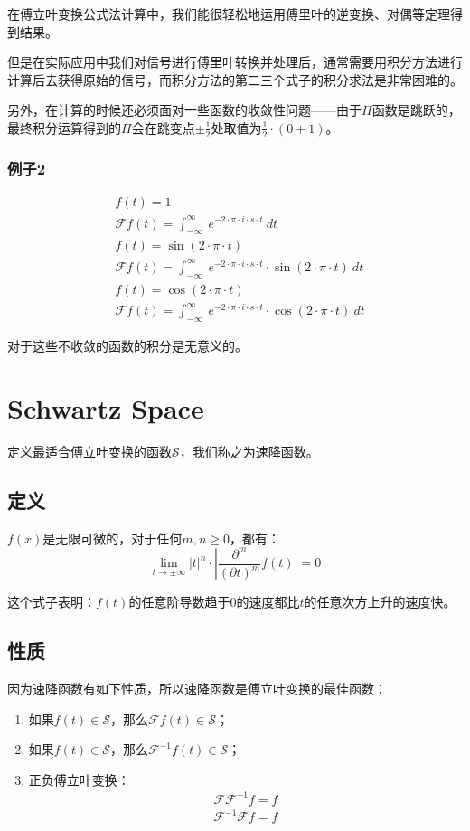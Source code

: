 在傅立叶变换公式法计算中，我们能很轻松地运用傅里叶的逆变换、对偶等定理得到结果。

但是在实际应用中我们对信号进行傅里叶转换并处理后，通常需要用积分方法进行计算后去获得原始的信号，而积分方法的第二三个式子的积分求法是非常困难的。

另外，在计算的时候还必须面对一些函数的收敛性问题——由于$\Pi$函数是跳跃的，最终积分运算得到的$\Pi$会在跳变点$\pm \frac{1}{2}$处取值为$\frac{1}{2}\cdot (0+1)$。
\subsubsection{例子2}
\begin{align*}
	 & f(t)  =1                                                                                                       \\
	 & \mathcal{F}f(t)=\int_{-\infty}^{\infty}\ e^{-2\cdot \pi\cdot i\cdot s\cdot t}\ dt                              \\
	 & f(t) =\sin(2\cdot\pi\cdot t)                                                                                   \\
	 & \mathcal{F}f(t)  =\int_{-\infty}^{\infty}\ e^{-2\cdot \pi\cdot i\cdot s\cdot t}\cdot\sin(2\cdot\pi\cdot t)\ dt \\
	 & f(t)=\cos(2\cdot\pi\cdot t)                                                                                    \\
	 & \mathcal{F}f(t)=\int_{-\infty}^{\infty}\ e^{-2\cdot \pi\cdot i\cdot s\cdot t}\cdot \cos(2\cdot\pi\cdot t)\ dt
\end{align*}

对于这些不收敛的函数的积分是无意义的。
\section{Schwartz Space}
定义最适合傅立叶变换的函数$\mathcal  {S}$，我们称之为速降函数。
\subsection{定义}
$f(x)$是无限可微的，对于任何$m,n\geq 0$，都有：
$$
	\lim\limits_{t\rightarrow\pm\infty}|t|^n\cdot |\frac{\partial^m}{(\partial t)^m}f(t)|=0
$$

这个式子表明：$f(t)$的任意阶导数趋于$0$的速度都比$t$的任意次方上升的速度快。
\subsection{性质}
因为速降函数有如下性质，所以速降函数是傅立叶变换的最佳函数：
\begin{enumerate}
	\item 如果$f(t)\in \mathcal  {S}$，那么$\mathcal{F}f(t)\in \mathcal  {S}$；
	\item 如果$f(t)\in \mathcal  {S}$，那么$\mathcal{F}^{-1}f(t)\in \mathcal  {S}$；
	\item 正负傅立叶变换：
	      \begin{align*}
		      \mathcal{F}\mathcal{F}^{-1}f=f \\
		      \mathcal{F}^{-1}\mathcal{F}f=f
	      \end{align*}
\end{enumerate}

